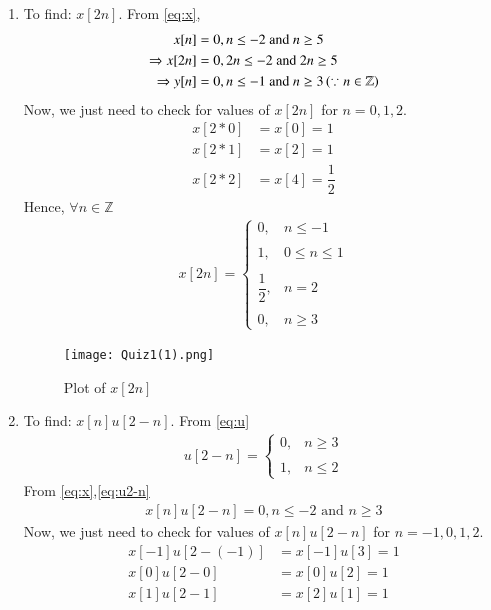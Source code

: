 \documentclass[journal,12pt,twocolumn]{IEEEtran}
\begin{document}
\begin{enumerate}
\item To find: $x[2n]$. From \eqref{eq:x},
\begin{align}
    x[n]&=0, n\leq -2 \text{ and } n\geq 5\\
    \Rightarrow x[2n]&=0, 2n\leq -2 \text{ and } 2n\geq 5\\
    \Rightarrow y[n]&=0, n\leq -1 \text{ and } n\geq 3 \left(\because n \in \mathbb{Z}\right)
\end{align}
Now, we just need to check for values of $x[2n]$ for $n=0,1,2$.
\begin{align}
    x[2*0]&=x[0]=1\\
    x[2*1]&=x[2]=1\\
    x[2*2]&=x[4]=\dfrac{1}{2}
\end{align}
Hence, $\forall n \in \mathbb{Z}$
\begin{align}
    x[2n]=\begin{cases}
	0, & n \leq -1 \\~\\[-1em]
	1, & 0 \leq n \leq 1 \\~\\[-1em]
	\dfrac{1}{2}, & n=2 \\~\\[-1em]
	0, & n \geq 3
	\end{cases}
	\label{eq:y}
\end{align}
\begin{figure}[!h]
 \centering
 \texttt{[image: Quiz1(1).png]}
 \caption{Plot of $x[2n]$}
 \label{plot}
\end{figure}
\item To find: $x[n]u[2-n]$. From \eqref{eq:u}
\begin{align}
    u[2-n]=\begin{cases}
	0, & n \geq 3 \\~\\[-1em]
	1, & n \leq 2
	\end{cases}
	\label{eq:u2-n}
\end{align}
From \eqref{eq:x},\eqref{eq:u2-n}
\begin{align}
    x[n]u[2-n]=0, n\leq -2 \text{ and } n\geq 3
\end{align}
Now, we just need to check for values of $x[n]u[2-n]$ for $n=-1,0,1,2$.
\begin{align}
    x[-1]u[2-(-1)]&=x[-1]u[3]=1\\
    x[0]u[2-0]&=x[0]u[2]=1\\
    x[1]u[2-1]&=x[2]u[1]=1\\

\end{align}
\end{enumerate}
\end{document}
